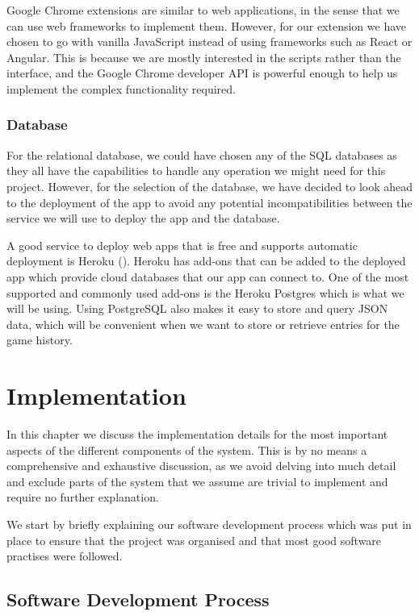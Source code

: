 \documentclass{l4proj}
\begin{document}
Google Chrome extensions are similar to web applications, in the sense that we can use web frameworks to implement them. However, for our extension we have chosen to go with vanilla JavaScript instead of using frameworks such as React or Angular.
This is because we are mostly interested in the scripts rather than the interface, and the Google Chrome developer API is powerful enough to help us implement the complex functionality required.

\subsection{Database}
For the relational database, we could have chosen any of the SQL databases as they all have the capabilities to handle any operation we might need for this project. However, for the selection of the database, we have decided to look ahead to the deployment of the 
app to avoid any potential incompatibilities between the service we will use to deploy the app and the database. 

A good service to deploy web apps that is free and supports automatic deployment is Heroku (\cite{heroku}). Heroku has add-ons that can be added to the deployed app which provide cloud databases that
our app can connect to. One of the most supported and commonly used add-ons is the Heroku Postgres which is what we will be using. Using PostgreSQL also makes it easy to store and query JSON data, which will be convenient when we want to store or retrieve entries for the game history.

\chapter{Implementation}
\label{implementation}

In this chapter we discuss the implementation details for the most important aspects of the different components of the system. This is by no means a comprehensive and exhaustive discussion, as we avoid delving into much detail and exclude parts of the system that we assume are trivial to implement and require no further explanation. 

We start by briefly explaining our software development process which was put in place to ensure that the project was organised and that most good software practises were followed.

\section{Software Development Process}
\end{document}

